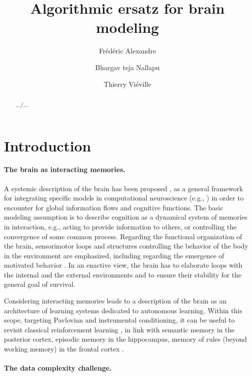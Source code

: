 \documentclass[a4,12pt,twoside]{article}
\newif\ifRR
\begin{document}
\ifRR
\makeRR 
\else
\title{Algorithmic ersatz for brain modeling}
\author[1]{Fr\'ed\'eric Alexandre}
\author[1]{Bhargav teja Nallapu}
\author[1]{Thierry Vi\'eville}
\maketitle
\begin{abstract}.../...\end{abstract}
\fi

\section{Introduction}

\paragraph{The brain as interacting memories.}

A systemic description of the brain has been proposed \cite{alexandre:hal-01246653}, as a general framework for integrating specific models in computational neuroscience (e.g., \cite{gershman2010context,koechlin2007information,balleine2006parallel,carrere:hal-01145790}) in order to encounter for global information flows and cognitive functions. The basic modeling assumption is to describe cognition as a dynamical system of memories in interaction, e.g., acting to provide information to others, or controlling the convergence of some common process. Regarding the functional organization of the brain, sensorimotor loops and structures controlling the behavior of the body in the environment are emphasized, including regarding the emergence of motivated behavior \cite{cardinal2002emotion,windridge2017emergent}. In an enactive view, the brain has to elaborate loops with the internal and the external environments and to ensure their stability for the general goal of survival.
 
Considering interacting memories leads to a description of the brain as an architecture of learning systems dedicated to autonomous learning. Within this scope, targeting Pavlovian and instrumental conditioning, it can be useful to revisit classical reinforcement learning \cite{redish2007reconciling}, in link with semantic memory in the posterior cortex, episodic memory in the hippocampus, memory of rules (beyond working memory) in the frontal cortex \cite{domenech2015executive,OReilly2014GoalDrivenCI}.

\paragraph{The data complexity challenge.}
\end{document}
